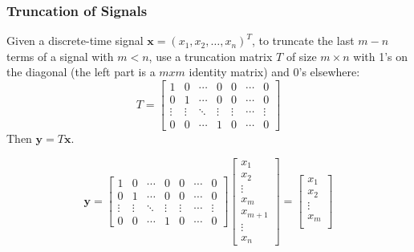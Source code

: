 \subsubsection*{Truncation of Signals}
Given a discrete-time signal \( \mathbf{x} = (x_1, x_2, \ldots, x_n)^T \), to truncate the last \( m-n \) terms of a signal with \(m<n\), use a truncation matrix \( T \) of size \( m \times n \) with 1's on the diagonal (the left part is a $mxm$ identity matrix) and 0's elsewhere:
\[ T = \begin{bmatrix}
1 & 0 & \cdots & 0 & 0&\cdots & 0 \\
0 & 1 & \cdots & 0 & 0&\cdots & 0 \\
\vdots & \vdots & \ddots & \vdots & \vdots&\cdots & \vdots \\
0 & 0 & \cdots & 1 & 0&\cdots & 0
\end{bmatrix} \]
Then \( \mathbf{y} = T\mathbf{x} \).

\[
\mathbf{y}=\begin{bmatrix}
1 & 0 & \cdots & 0 & 0&\cdots & 0 \\
0 & 1 & \cdots & 0 & 0&\cdots & 0 \\
\vdots & \vdots & \ddots & \vdots & \vdots&\cdots & \vdots \\
0 & 0 & \cdots & 1 & 0&\cdots & 0
\end{bmatrix} \begin{bmatrix}
    x_1 \\ x_2 \\ \vdots \\ x_m \\ x_{m+1} \\ \vdots \\ x_n
\end{bmatrix}= \begin{bmatrix}
    x_1 \\ x_2 \\ \vdots \\ x_m \\ 
\end{bmatrix} 
\]

